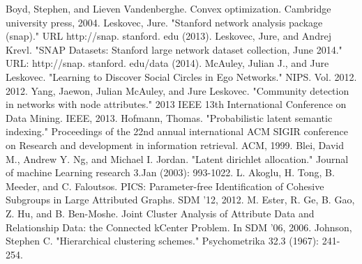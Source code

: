 \documentclass[11pt]{article}
\begin{document}
\begin{thebibliography}{3}
Boyd, Stephen, and Lieven Vandenberghe. Convex optimization. Cambridge university press, 2004.
Leskovec, Jure. "Stanford network analysis package (snap)." URL http://snap. stanford. edu (2013).
Leskovec, Jure, and Andrej Krevl. "SNAP Datasets: Stanford large network dataset collection, June 2014." URL: http://snap. stanford. edu/data (2014).
McAuley, Julian J., and Jure Leskovec. "Learning to Discover Social Circles in Ego Networks." NIPS. Vol. 2012. 2012.
Yang, Jaewon, Julian McAuley, and Jure Leskovec. "Community detection in networks with node attributes." 2013 IEEE 13th International Conference on Data Mining. IEEE, 2013.
Hofmann, Thomas. "Probabilistic latent semantic indexing." Proceedings of the 22nd annual international ACM SIGIR conference on Research and development in information retrieval. ACM, 1999.
Blei, David M., Andrew Y. Ng, and Michael I. Jordan. "Latent dirichlet allocation." Journal of machine Learning research 3.Jan (2003): 993-1022.
 L. Akoglu, H. Tong, B. Meeder, and C. Faloutsos. PICS: Parameter-free
Identification of Cohesive Subgroups in Large Attributed Graphs. SDM
’12, 2012.
M. Ester, R. Ge, B. Gao, Z. Hu, and B. Ben-Moshe. Joint Cluster
Analysis of Attribute Data and Relationship Data: the Connected kCenter
Problem. In SDM ’06, 2006.
Johnson, Stephen C. "Hierarchical clustering schemes." Psychometrika 32.3 (1967): 241-254.
\end{thebibliography}
\end{document}

